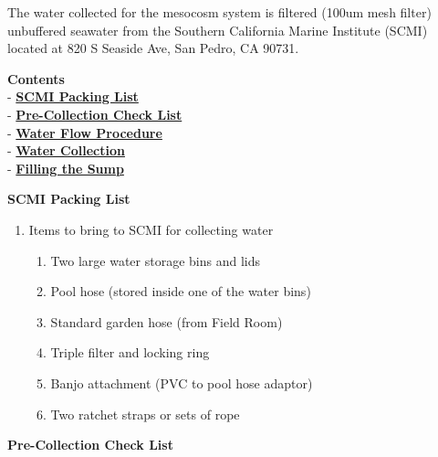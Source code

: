 \documentclass[
]{book}
\providecommand{\tightlist}{%
  \setlength{\itemsep}{0pt}\setlength{\parskip}{0pt}}
\begin{document}
The water collected for the mesocosm system is filtered (100um mesh filter) unbuffered seawater from the Southern California Marine Institute (SCMI) located at 820 S Seaside Ave, San Pedro, CA 90731.

\textbf{Contents}\\
- \protect\hyperlink{packing_list}{\textbf{SCMI Packing List}}\\
- \protect\hyperlink{check_list}{\textbf{Pre-Collection Check List}}\\
- \protect\hyperlink{water_flow}{\textbf{Water Flow Procedure}}\\
- \protect\hyperlink{water_collection}{\textbf{Water Collection}}\\
- \protect\hyperlink{filling_the_sump}{\textbf{Filling the Sump}}

\textbf{SCMI Packing List}

\begin{enumerate}
\def\labelenumi{\arabic{enumi}.}
\tightlist
\item
  Items to bring to SCMI for collecting water

  \begin{enumerate}
  \def\labelenumii{\arabic{enumii}.}
  \tightlist
  \item
    Two large water storage bins and lids
  \item
    Pool hose (stored inside one of the water bins)
  \item
    Standard garden hose (from Field Room)
  \item
    Triple filter and locking ring
  \item
    Banjo attachment (PVC to pool hose adaptor)
  \item
    Two ratchet straps or sets of rope
  \end{enumerate}
\end{enumerate}

\textbf{Pre-Collection Check List}
\end{document}
